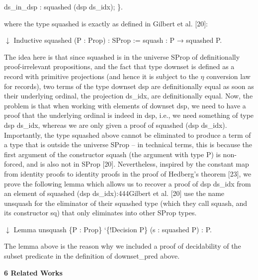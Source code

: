\documentclass[10pt,a4paper]{article}
\begin{document}
  ds\_in\_dsp : squashed (dsp ds\_idx); \}. 
  
where the type squashed is exactly as defined in Gilbert et al. [20]:\par
  \ensuremath{\downarrow} 
 Inductive squashed (P : Prop) : SProp := squash : P → squashed P. 
  
The idea here is that since squashed is in the universe SProp of definitionally proof-irrelevant propositions, and the fact that type downset is defined as a record with primitive projections (and hence it is subject to the $\eta$ conversion law for records), two terms of the type downset dsp are definitionally equal as soon as their underlying ordinal, the projection ds\_idx, are definitionally equal. Now, the problem is that when working with elements of downset dsp, we need to have a proof that the underlying ordinal is indeed in dsp, i.e., we need something of type dsp ds\_idx, whereas we are only given a proof of squashed (dsp ds\_idx). Importantly, the type squashed above cannot be eliminated to produce a term of a type that is outside the universe SProp – in technical terms, this is because the first argument of the constructor squash (the argument with type P) is non-forced, and is also not in SProp [20]. Nevertheless, inspired by the constant map from identity proofs to identity proofs in the proof of Hedberg’s theorem [23], we prove the following lemma which allows us to recover a proof of dsp ds\_idx from an element of squashed (dsp ds\_idx):444Gilbert et al. [20] use the name unsquash for the eliminator of their squashed type (which they call squash, and its constructor sq) that only eliminates into other SProp types.\par
  \ensuremath{\downarrow} 
 Lemma unsquash \{P : Prop\} ‘\{!Decision P\} (s : squashed P) : P. 
  
The lemma above is the reason why we included a proof of decidability of the subset predicate in the definition of downset\_pred above.\par
 
 
 


 
\par\medskip\noindent\textbf{6 Related Works}\par
 
\end{document}
